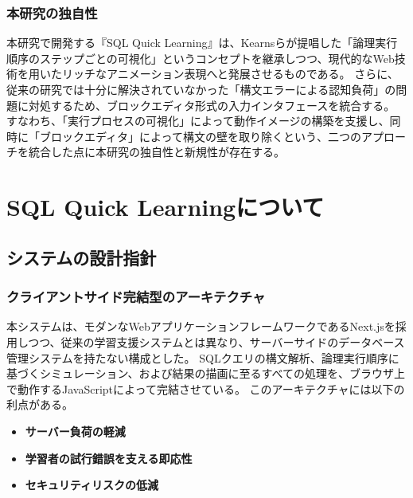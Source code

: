 \documentclass[uplatex,a4paper,12pt]{ujreport}
\begin{document}
\subsection{本研究の独自性}
本研究で開発する『SQL Quick Learning』は、Kearnsらが提唱した「論理実行順序のステップごとの可視化」というコンセプトを継承しつつ、現代的なWeb技術を用いたリッチなアニメーション表現へと発展させるものである。
さらに、従来の研究では十分に解決されていなかった「構文エラーによる認知負荷」の問題に対処するため、ブロックエディタ形式の入力インタフェースを統合する。
すなわち、「実行プロセスの可視化」によって動作イメージの構築を支援し、同時に「ブロックエディタ」によって構文の壁を取り除くという、二つのアプローチを統合した点に本研究の独自性と新規性が存在する。



\chapter{SQL Quick Learningについて}
\section{システムの設計指針}
\subsection{クライアントサイド完結型のアーキテクチャ}
本システムは、モダンなWebアプリケーションフレームワークであるNext.jsを採用しつつ、従来の学習支援システムとは異なり、サーバーサイドのデータベース管理システムを持たない構成とした。
SQLクエリの構文解析、論理実行順序に基づくシミュレーション、および結果の描画に至るすべての処理を、ブラウザ上で動作するJavaScriptによって完結させている。
このアーキテクチャには以下の利点がある。
\begin{itemize}
  \item \textbf{サーバー負荷の軽減}
  \item \textbf{学習者の試行錯誤を支える即応性}
  \item \textbf{セキュリティリスクの低減}
\end{itemize}
\end{document}
